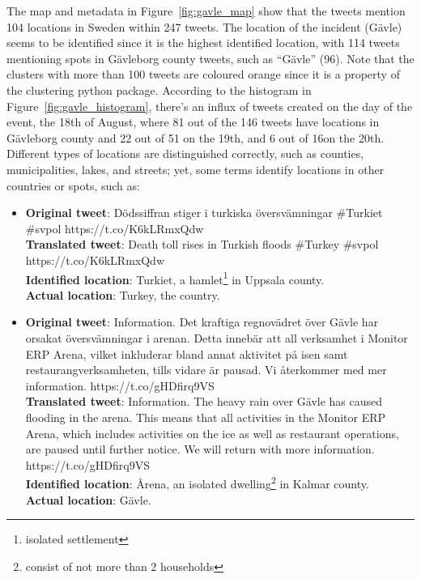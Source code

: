 The map and metadata in Figure~\ref{fig:gavle_map} show that the tweets mention 104 locations in
Sweden within 247 tweets. The location of the incident (Gävle) seems to be identified since it is
the highest identified location, with 114 tweets mentioning spots in Gävleborg county tweets, such
as ``Gävle'' (96). Note that the clusters with more than 100 tweets are coloured orange since it is
a property of the clustering python package. According to the histogram in
Figure~\ref{fig:gavle_histogram}, there's an influx of tweets created on the day of the event, the
18th of August, where 81 out of the 146 tweets have locations in Gävleborg county and 22 out of 51
on the 19th, and 6 out of 16on the 20th. Different types of locations are distinguished correctly,
such as counties, municipalities, lakes, and streets; yet, some terms identify locations in other
countries or spots, such as:

\begin{itemize}
  \item \textbf{Original tweet}: Dödssiffran stiger i turkiska översvämningar \#Turkiet \#svpol
    https://t.co/K6kLRmxQdw \\
  \textbf{Translated tweet}: Death toll rises in Turkish floods \#Turkey \#svpol \\
    https://t.co/K6kLRmxQdw \\
    \textbf{Identified location}: Turkiet, a hamlet\footnote{isolated settlement} in Uppsala county. \\
    \textbf{Actual location}: Turkey, the country.

  \item \textbf{Original tweet}: Information. Det kraftiga regnovädret över Gävle har orsakat
    översvämningar i arenan. Detta innebär att all verksamhet i Monitor ERP Arena, vilket inkluderar
    bland annat aktivitet på isen samt restaurangverksamheten, tills vidare är pausad. Vi återkommer
    med mer information. https://t.co/gHDfirq9VS \\
    \textbf{Translated tweet}: Information. The heavy rain over Gävle has caused flooding in the arena.
    This means that all activities in the Monitor ERP Arena, which includes activities on the ice as
    well as restaurant operations, are paused until further notice. We will return with more
    information. https://t.co/gHDfirq9VS \\
    \textbf{Identified location}: Årena, an isolated dwelling\footnote{consist of not more than 2 households}
    in Kalmar county. \\
    \textbf{Actual location}: Gävle.


\end{itemize}

